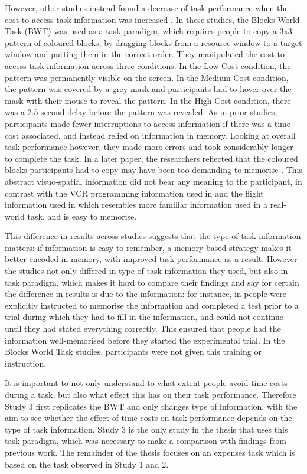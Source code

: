 However, other studies instead found a decrease of task performance when the cost to access task information was increased \citep{Gray2006, Morgan2009}. In these studies, the Blocks World Task (BWT) was used as a task paradigm, which requires people to copy a 3x3 pattern of coloured blocks, by dragging blocks from a resource window to a target window and putting them in the correct order. They manipulated the cost to access task information across three conditions. In the Low Cost condition, the pattern was permanently visible on the screen. In the Medium Cost condition, the pattern was covered by a grey mask and participants had to hover over the mask with their mouse to reveal the pattern. In the High Cost condition, there was a 2.5 second delay before the pattern was revealed. As in prior studies, participants made fewer interruptions to access information if there was a time cost associated, and instead relied on information in memory. Looking at overall task performance however, they made more errors and took considerably longer to complete the task. In a later paper, the researchers reflected that the coloured blocks participants had to copy may have been too demanding to memorise \citep{Waldron2011}. This abstract visuo-spatial information did not bear any meaning to the participant, in contrast with the VCR programming information used in \citet{Gray2004} and the flight information used in \citet{Waldron2007} which resembles more familiar information used in a real-world task, and is easy to memorise.

This difference in results across studies suggests that the type of task information matters: if information is easy to remember, a memory-based strategy makes it better encoded in memory, with improved task performance as a result. However the studies not only differed in type of task information they used, but also in task paradigm, which makes it hard to compare their findings and say for certain the difference in results is due to the information: for instance, in \citet{Gray2004} people were explicitly instructed to memorise the information and completed a test prior to a trial during which they had to fill in the information, and could not continue until they had stated everything correctly. This ensured that people had the information well-memorised before they started the experimental trial. In the Blocks World Task studies, participants were not given this training or instruction.

It is important to not only understand to what extent people avoid time costs during a task, but also what effect this has on their task performance. Therefore Study 3 first replicates the BWT and only changes type of information, with the aim to see whether the effect of time costs on task performance depends on the type of task information. Study 3 is the only study in the thesis that uses this task paradigm, which was necessary to make a comparison with findings from previous work. The remainder of the thesis focuses on an expenses task which is based on the task observed in Study 1 and 2. 

